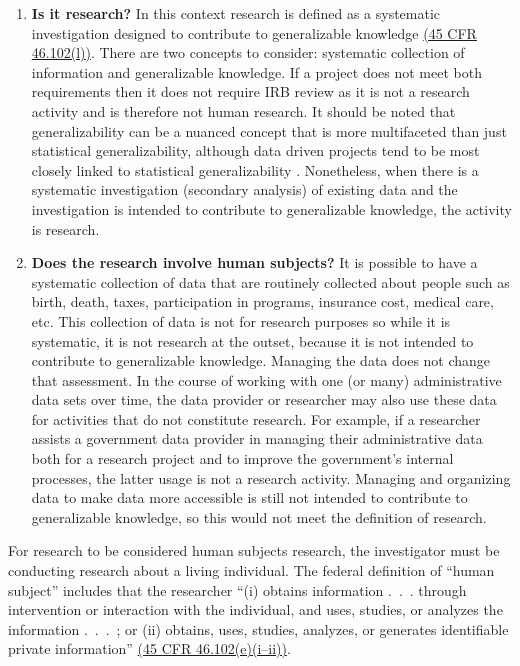 \documentclass[
]{WileySix}
\providecommand{\tightlist}{%
  \setlength{\itemsep}{0pt}\setlength{\parskip}{0pt}}
\begin{document}
\begin{enumerate}
\def\labelenumi{\arabic{enumi}.}
\tightlist
\item
  \textbf{Is it research?} In this context research is defined as a systematic investigation designed to contribute to generalizable knowledge \href{https://www.law.cornell.edu/cfr/text/45/46.102}{(45 CFR 46.102(l))}. There are two concepts to consider: systematic collection of information and generalizable knowledge. If a project does not meet both requirements then it does not require IRB review as it is not a research activity and is therefore not human research. It should be noted that generalizability can be a nuanced concept that is more multifaceted than just statistical generalizability, although data driven projects tend to be most closely linked to statistical generalizability \citep{lee2003}. Nonetheless, when there is a systematic investigation (secondary analysis) of existing data and the investigation is intended to contribute to generalizable knowledge, the activity is research.
\item
  \textbf{Does the research involve human subjects?} It is possible to have a systematic collection of data that are routinely collected about people such as birth, death, taxes, participation in programs, insurance cost, medical care, etc. This collection of data is not for research purposes so while it is systematic, it is not research at the outset, because it is not intended to contribute to generalizable knowledge. Managing the data does not change that assessment. In the course of working with one (or many) administrative data sets over time, the data provider or researcher may also use these data for activities that do not constitute research. For example, if a researcher assists a government data provider in managing their administrative data both for a research project and to improve the government's internal processes, the latter usage is not a research activity. Managing and organizing data to make data more accessible is still not intended to contribute to generalizable knowledge, so this would not meet the definition of research.
\end{enumerate}

For research to be considered human subjects research, the investigator must be conducting research about a living individual. The federal definition of ``human subject'' includes that the researcher ``(i) obtains information .~.~. through intervention or interaction with the individual, and uses, studies, or analyzes the information .~.~.~; or (ii) obtains, uses, studies, analyzes, or generates identifiable private information'' \href{https://www.law.cornell.edu/cfr/text/45/46.102}{(45 CFR 46.102(e)(i--ii))}.
\end{document}
